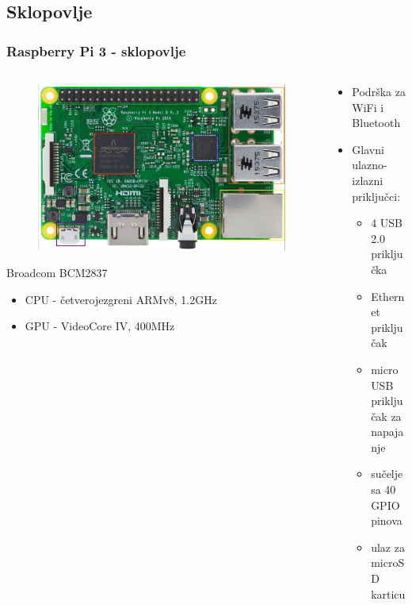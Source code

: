 \documentclass[12pt]{beamer}
\begin{document}
\subsection{Sklopovlje}
\begin{frame}
	\frametitle{Raspberry Pi 3 - sklopovlje}
	\begin{columns}[T]
	    \begin{column}{.5\textwidth}
		\begin{figure}[h]
			\begin{minipage}{\textwidth}
				\centering
				\includegraphics[width=\linewidth]{slike/rpi3_color.png}
			\end{minipage}
		\end{figure}
		Broadcom BCM2837
			\begin{itemize}
				\item CPU - četverojezgreni ARMv8, 1.2GHz
				\item GPU - VideoCore IV, 400MHz
			\end{itemize}
		\end{column}

		\begin{column}{.5\textwidth}
			\begin{itemize}
				\item Podrška za WiFi i Bluetooth
				\item Glavni ulazno-izlazni priključci:
				\begin{itemize}
					\item 4 USB 2.0 priključka
					\item Ethernet priključak
					\item microUSB priključak za napajanje
					\item sučelje sa 40 GPIO pinova
					\item ulaz za microSD karticu
				\end{itemize}
			\end{itemize}
		\end{column}
	\end{columns}
\end{frame}
\end{document}
